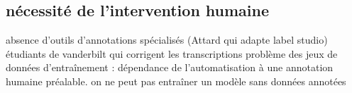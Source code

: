 \subsection{nécessité de l'intervention humaine}

absence d'outils d'annotations spécialisés (Attard qui adapte label studio)
étudiants de vanderbilt qui corrigent les transcriptions
problème des jeux de données d'entraînement : dépendance de l'automatisation à une annotation humaine préalable.
on ne peut pas entraîner un modèle sans données annotées